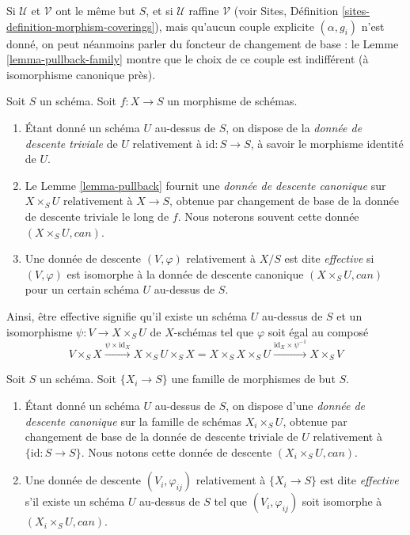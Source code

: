 \noindent
Si $\mathcal{U}$ et $\mathcal{V}$ ont le même but $S$, et si
$\mathcal{U}$ raffine $\mathcal{V}$ (voir
Sites, Définition \ref{sites-definition-morphism-coverings}), mais qu'aucun
couple explicite $(\alpha, g_i)$ n'est donné, on peut néanmoins parler du
foncteur de changement de base : le
Lemme \ref{lemma-pullback-family} montre que le choix de ce couple est
indifférent (à isomorphisme canonique près).


\begin{definition}
\label{definition-effective}
Soit $S$ un schéma.
Soit $f : X \to S$ un morphisme de schémas.
\begin{enumerate}
\item Étant donné un schéma $U$ au-dessus de $S$, on dispose de la
{\it donnée de descente triviale} de $U$ relativement à
$\text{id} : S \to S$, à savoir le morphisme identité de $U$.
\item Le Lemme \ref{lemma-pullback} fournit une
{\it donnée de descente canonique} sur $X \times_S U$ relativement à
$X \to S$, obtenue par changement de base de la donnée de descente triviale
le long de $f$. Nous noterons souvent cette donnée
$(X \times_S U, can)$.
\item Une donnée de descente $(V, \varphi)$ relativement à $X/S$ est dite
{\it effective} si $(V, \varphi)$ est isomorphe à la donnée de descente
canonique $(X \times_S U, can)$ pour un certain schéma $U$ au-dessus de $S$.
\end{enumerate}
\end{definition}

\noindent
Ainsi, être effective signifie qu'il existe un schéma $U$ au-dessus de $S$
et un isomorphisme $\psi : V \to X \times_S U$ de $X$-schémas tel que
$\varphi$ soit égal au composé
$$
V \times_S X \xrightarrow{\psi \times \text{id}_X}
X \times_S U \times_S X =
X \times_S X \times_S U
\xrightarrow{\text{id}_X \times \psi^{-1}}
X \times_S V
$$

\begin{definition}
\label{definition-effective-family}
Soit $S$ un schéma.
Soit $\{X_i \to S\}$ une famille de morphismes de but $S$.
\begin{enumerate}
\item Étant donné un schéma $U$ au-dessus de $S$, on dispose d'une
{\it donnée de descente canonique} sur la famille de schémas
$X_i \times_S U$, obtenue par changement de base de la donnée de descente
triviale de $U$ relativement à $\{\text{id} : S \to S\}$.
Nous notons cette donnée de descente $(X_i \times_S U, can)$.
\item Une donnée de descente $(V_i, \varphi_{ij})$ relativement à
$\{X_i \to S\}$ est dite {\it effective} s'il existe un schéma $U$ au-dessus
de $S$ tel que $(V_i, \varphi_{ij})$ soit isomorphe à
$(X_i \times_S U, can)$.
\end{enumerate}
\end{definition}












